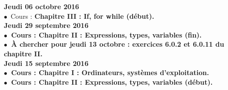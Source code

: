 \documentclass[12pt,a4paper]{article}
\begin{document}
%   
%  
%  
\noindent\textbf{\bf Jeudi 06 octobre 2016 \rm}\\
$\bullet$\ Cours : \bf Chapitre III \rm : If, for while (début).\vspace{.4cm}\\
  
\noindent\textbf{\bf Jeudi 29 septembre 2016 \rm}\\
$\bullet$\ Cours :  \bf Chapitre II \rm : Expressions, types, variables (fin).\\
$\bullet$\ À chercher pour jeudi 13 octobre : exercices 6.0.2 et 6.0.11 du chapitre 
II.\vspace{.4cm}\\

\noindent\textbf{\bf Jeudi 15 septembre 2016 \rm}\\
$\bullet$\ Cours :  \bf Chapitre I \rm : Ordinateurs, systèmes d'exploitation.\vspace{.4cm}\\
$\bullet$\ Cours :  \bf Chapitre II \rm : Expressions, types, variables (début).\vspace{.4cm}\\


\label{end}
\end{document}
